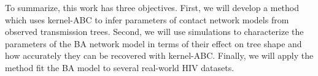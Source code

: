 To summarize, this work has three objectives. First, we will develop a method
which uses kernel-\gls{ABC} to infer parameters of contact network models from
observed transmission trees. Second, we will use simulations to characterize
the parameters of the \gls{BA} network model in terms of their effect on tree
shape and how accurately they can be recovered with kernel-\gls{ABC}. Finally,
we will apply the method fit the \gls{BA} model to several real-world \gls{HIV}
datasets.
